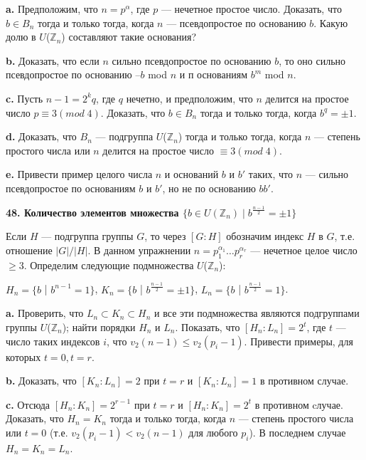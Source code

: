 \documentclass{mai_book}
\begin{document}
\textbf{a.} Предположим, что $n=p^{\alpha}$, где $p$ --- нечетное простое число.
Доказать, что $b\in B_n$ тогда и только тогда, когда $n$ --- псевдопростое по основанию $b$.
Какую долю в $U$($\mathbb {Z}_n$) составляют такие основания?

\smallskip
\textbf{b.} Доказать, что если $n$ сильно псевдопростое по основанию $b$, то оно сильно псевдопростое по основанию --$b$ mod $n$ и п основаниям $b^m$ mod $n$.

\smallskip
\textbf{c.} Пусть $n-1=2^kq$, где $q$ нечетно, и предположим, что $n$ делится на простое число $p\equiv 3 (mod\;4)$.
Доказать, что $b\in B_n$ тогда и только тогда, когда $b^q=\pm 1$.

\smallskip
\textbf{d.} Доказать, что  $B_n$ --- подгруппа $U$($\mathbb {Z}_n$) тогда и только тогда, когда $n$ --- степень простого числа или $n$ делится на простое число $\equiv 3 (mod\;4)$.

\smallskip
\textbf{e.} Привести пример целого числа $n$ и оснований $b$ и $b'$ таких, что $n$ --- сильно псевдопростое по основаниям $b$ и $b'$, но не по основанию $bb'$.

\bigskip
\noindent\textbf{48. Количество элементов множества $\{b\in U(\mathbb {Z}_n)\;|\;b^{\frac{n-1}2}=\pm1 \}$}

\medskip
Если $H$ --- подгруппа группы $G$, то через $[G : H]$ обозначим индекс $H$ в $G$, т.е. отношение $|G|/|H|$.
В данном упражнении  $n = p^{\alpha_1}_1 \dots p^{\alpha_r}_r$ --- нечетное целое число $\ge 3$.
Определим следующие подмножества $U$($\mathbb {Z}_n$):


\begin{center}
$H_n=\{b$ | $b^{n-1}=1\}$, \qquad $K_n=\{b$ | $b^\frac{n-1}2=\pm1\}$, \qquad  $L_n=\{b$ | $b^\frac{n-1}2=1\}$.
\end{center}



\textbf{a.} Проверить, что $L_n \subset K_n \subset H_n$ и все эти подмножества являются подгруппами группы $U$($\mathbb {Z}_n$); найти порядки $H_n$ и $L_n$.
Показать, что $[H_n : L_n] = 2^t$, где $t$ --- число таких индексов $i$, что $v_2(n-1) \le v_2(p_i-1)$.
Привести примеры, для которых $t=0, t=r$.

\smallskip
\textbf{b.} Доказать, что $[K_n : L_n]=2$ при $t = r$ и $[K_n : L_n]=1$ в противном случае.

\smallskip
\textbf{c.} Отсюда $[H_n : K_n]=2^{r-1}$ при $t = r$ и $[H_n : K_n]=2^t$ в противном cлучае.
Доказать, что $H_n=K_n$ тогда и только тогда, когда $n$ — сте­пень простого числа или $t=0$ (т.е. $v_2(p_i-1) < v_2(n-1)$ для любого $p_i$).
В последнем случае $H_n=K_n=L_n$.
\end{document}
